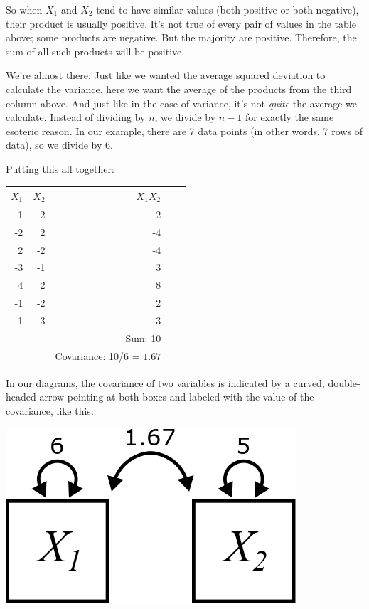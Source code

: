 \documentclass[
]{book}
\begin{document}
So when \(X_{1}\) and \(X_{2}\) tend to have similar values (both positive or both negative), their product is usually positive. It's not true of every pair of values in the table above; some products are negative. But the majority are positive. Therefore, the sum of all such products will be positive.

We're almost there. Just like we wanted the average squared deviation to calculate the variance, here we want the average of the products from the third column above. And just like in the case of variance, it's not \emph{quite} the average we calculate. Instead of dividing by \(n\), we divide by \(n - 1\) for exactly the same esoteric reason. In our example, there are 7 data points (in other words, 7 rows of data), so we divide by 6.

Putting this all together:

\begin{longtable}[]{@{}rrrl@{}}
\toprule
\(X_{1}\) & \(X_{2}\) & \(X_{1}X_{2}\) & \(\quad\) \\
\midrule
\endhead
-1 & -2 & 2 & \\
-2 & 2 & -4 & \\
2 & -2 & -4 & \\
-3 & -1 & 3 & \\
4 & 2 & 8 & \\
-1 & -2 & 2 & \\
1 & 3 & 3 & \\
& & Sum: 10 & \\
& & Covariance: 10/6 = \(\boxed{1.67}\) & \\
\bottomrule
\end{longtable}

In our diagrams, the covariance of two variables is indicated by a curved, double-headed arrow pointing at both boxes and labeled with the value of the covariance, like this:

\begin{center}\includegraphics{graphics/covariance_labeled} \end{center}
\end{document}
